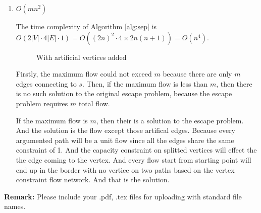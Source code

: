 \documentclass[12pt,a4paper]{article}
\makeatletter
\newtheorem*{solution}{Solution}
\theoremstyle{definition}
\renewenvironment{solution}[1][Solution] {\par\pushQED{\qed}\normalfont\topsep6\p@\@plus6\p@\relax\trivlist\item[\hskip\labelsep\bfseries#1\@addpunct{.}]\ignorespaces}{\popQED\endtrivlist\@endpefalse} \makeatother
\makeatother
\begin{document}
\begin{enumerate}
\begin{enumerate}
\begin{solution}
			$O(mn^2)$
			
			\begin{tcolorbox}[skin=mycross]
				The time complexity of Algorithm \ref{alg:sep} is $O(2|V|\cdot 4|E|\cdot 1)=O((2n)^2\cdot 4\times 2n(n+1))=O(n^4)$.
			\end{tcolorbox}

			\begin{figure}[h]
				\centering
				
				\caption{With artificial vertices added}
				\label{fig:es}
			\end{figure}

			Firstly, the maximum flow could not exceed $m$ because there are only $m$ edges connecting to $s$. Then, if the maximum flow is less than $m$, then there is no such solution to the original escape problem, because the escape problem requires $m$ total flow.

			If the maximum flow is $m$, then their is a solution to the escape problem. And the solution is the flow except those artifical edges. Because every argumented path will be a unit flow since all the edges share the same constraint of 1. And the capacity constraint on splitted vertices will effect the the edge coming to the vertex. And every flow start from starting point will end up in the border with no vertice on two paths based on the vertex constraint flow network. And that is the solution.
		\end{solution}
    \end{enumerate}
\end{enumerate}

\textbf{Remark:} Please include your .pdf, .tex files for uploading with standard file names.
\newpage


\end{document}
